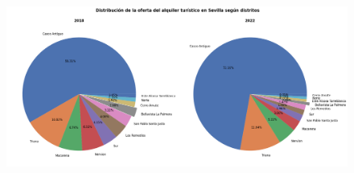 \documentclass[a4paper,10pt]{article}
\begin{document}
            \clearpage

            \begin{figure}[h]              
                \centering
                \includegraphics[width = 184mm]{graphics/sevilledensity.png}

            \end{figure}

            






















\end{document}
